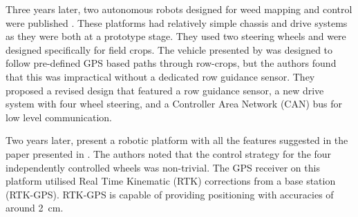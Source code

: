 \documentclass[preprint,authoryear,12pt]{elsarticle}
\begin{document}
        Three years later, two autonomous robots designed for weed mapping and control were published \citep{Pedersen2002,Astrand2002}.
        These platforms had relatively simple chassis and drive systems as they were both at a prototype stage.
        They used two steering wheels and were designed specifically for field crops.
        The vehicle presented by \cite{Pedersen2002} was designed to follow pre-defined GPS based paths through row-crops, but the authors found that this was impractical without a dedicated row guidance sensor.
        They proposed a revised design that featured a row guidance sensor, a new drive system with four wheel steering, and a Controller Area Network (CAN) bus for low level communication.

        Two years later, \cite{Bak2004} present a robotic platform with all the features suggested in the paper presented in \cite{Pedersen2002}.
        The authors noted that the control strategy for the four independently controlled wheels was non-trivial.
        The GPS receiver on this platform utilised Real Time Kinematic (RTK) corrections from a base station (RTK-GPS).
        RTK-GPS is capable of providing positioning with accuracies of around \SI{2}{\centi\meter}.

\end{document}

